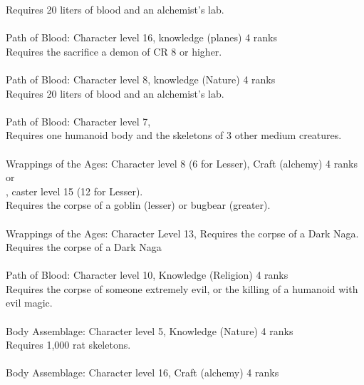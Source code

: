 \begin{multicols}{2}
\begin{small}
Requires 20 liters of blood and an alchemist's lab.\\
\\
Path of Blood: Character level 16, knowledge (planes) 4 ranks\\
Requires the sacrifice a demon of CR 8 or higher.\\
\\
Path of Blood: Character level 8, knowledge (Nature) 4 ranks\\
Requires 20 liters of blood and an alchemist's lab.\\
\\
Path of Blood: Character level 7, \\
Requires one humanoid body and the skeletons of 3 other medium creatures.\\
\\
Wrappings of the Ages: Character level 8 (6 for Lesser), Craft (alchemy) 4 ranks\\
or\\
, caster level 15 (12 for Lesser).\\
Requires the corpse of a goblin (lesser) or bugbear (greater).\\
\\
Wrappings of the Ages: Character Level 13, Requires the corpse of a Dark Naga.\\
Requires the corpse of a Dark Naga\\
\\
Path of Blood: Character level 10, Knowledge (Religion) 4 ranks\\
Requires the corpse of someone extremely evil, or the killing of a humanoid with evil magic.\\
\\
Body Assemblage: Character level 5, Knowledge (Nature) 4 ranks\\
Requires 1,000 rat skeletons.\\
\\
Body Assemblage: Character level 16, Craft (alchemy) 4 ranks\\

\end{small}
\end{multicols}
